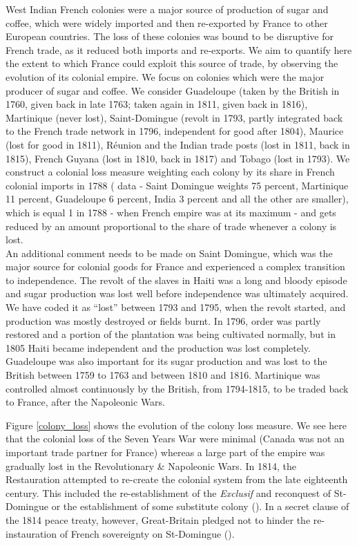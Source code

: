\documentclass[12pt,a4paper,notitlepage,english]{article}
\begin{document}
West Indian French colonies were a major source of production of sugar and coffee, which were widely imported and then re-exported by France to other European countries. The loss of these colonies was bound to be disruptive for French trade, as it reduced both imports and re-exports. 
We aim to quantify here the extent to which France could exploit this source of trade, by observing the evolution of its colonial empire.    
We focus on colonies which were the major producer of sugar and coffee. We consider Guadeloupe (taken by the British in 1760, given back in late 1763; taken again in 1811, given back in 1816), Martinique (never lost), Saint-Domingue (revolt in 1793, partly integrated back to the French trade network in 1796, independent for good after 1804), Maurice (lost for good in 1811), Réunion and the Indian trade posts (lost in 1811, back in 1815), French Guyana (lost in 1810, back in 1817) and Tobago (lost in 1793). 
We construct a colonial loss measure weighting each colony by its share in French colonial imports in 1788 (\cite{Daudin2020} data - Saint Domingue weights 75 percent, Martinique 11 percent, Guadeloupe 6 percent, India 3 percent and all the other are smaller), which is equal 1 in 1788 - when French empire was at its maximum - and gets reduced by an amount proportional to the share of trade whenever a colony is lost. \\
An additional comment needs to be made on Saint Domingue, which was the major source for colonial goods for France and experienced a complex transition to independence. 
The revolt of the slaves in Haiti was a long and bloody episode and sugar production was lost well before independence was ultimately acquired.
We have coded it as ``lost'' between 1793 and 1795, when the revolt started, and production was mostly destroyed or fields burnt.
In 1796, order was partly restored and a portion of the plantation was being cultivated normally, but in 1805 Haiti became independent and the production was lost completely.
Guadeloupe was also important for its sugar production and was lost to the British between 1759 to 1763 and between 1810 and 1816.
Martinique was controlled almost continuously by the British, from 1794-1815, to be traded back to France, after the Napoleonic Wars.

Figure \ref{colony_loss} shows the evolution of the colony loss measure. We see here that the colonial loss of the Seven Years War were minimal (Canada was not an important trade partner for France) whereas a large part of the empire was gradually lost in the Revolutionary \& Napoleonic Wars. 
In 1814, the Restauration attempted to re-create the colonial system from the late eighteenth century.
This included the re-establishment of the \textit{Exclusif} and reconquest of St-Domingue or the establishment of some substitute colony (\cite{Todd2011}). In a secret clause of the 1814 peace treaty, however, Great-Britain pledged not to hinder the re-instauration of French sovereignty on St-Domingue (\cite{Schefer1907}). 
\end{document}
